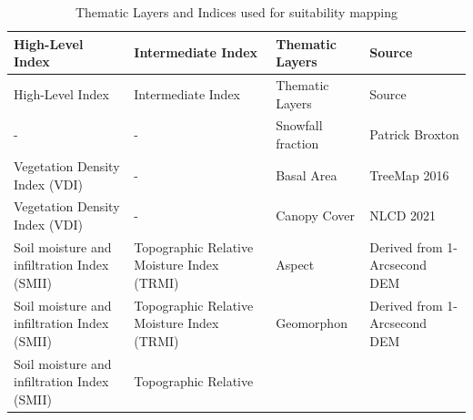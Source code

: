 \documentclass[
  number,
  preprint,
  3p,
  onecolumn]{elsarticle}
\begin{document}
\begin{longtable}[]{@{}
  >{\raggedright\arraybackslash}p{}
  >{\raggedright\arraybackslash}p{}
  >{\raggedright\arraybackslash}p{}
  >{\raggedright\arraybackslash}p{}@{}}
\caption{Thematic Layers and Indices used for suitability
mapping}\label{tbl-Thematic}\tabularnewline
\toprule\noalign{}
\begin{minipage}[b]{\linewidth}\raggedright
High-Level Index
\end{minipage} & \begin{minipage}[b]{\linewidth}\raggedright
Intermediate Index
\end{minipage} & \begin{minipage}[b]{\linewidth}\raggedright
Thematic Layers
\end{minipage} & \begin{minipage}[b]{\linewidth}\raggedright
Source
\end{minipage} \\
\midrule\noalign{}
\endfirsthead
\toprule\noalign{}
\begin{minipage}[b]{\linewidth}\raggedright
High-Level Index
\end{minipage} & \begin{minipage}[b]{\linewidth}\raggedright
Intermediate Index
\end{minipage} & \begin{minipage}[b]{\linewidth}\raggedright
Thematic Layers
\end{minipage} & \begin{minipage}[b]{\linewidth}\raggedright
Source
\end{minipage} \\
\midrule\noalign{}
\endhead
\bottomrule\noalign{}
\endlastfoot
- & - & Snowfall fraction & Patrick Broxton \\
Vegetation Density Index (VDI) & - & Basal Area & TreeMap 2016 \\
Vegetation Density Index (VDI) & - & Canopy Cover & NLCD 2021 \\
Soil moisture and infiltration Index (SMII) & Topographic Relative
Moisture Index (TRMI) & Aspect & Derived from 1-Arcsecond DEM \\
Soil moisture and infiltration Index (SMII) & Topographic Relative
Moisture Index (TRMI) & Geomorphon & Derived from 1-Arcsecond DEM \\
Soil moisture and infiltration Index (SMII) & Topographic Relative

\end{longtable}
\end{document}

